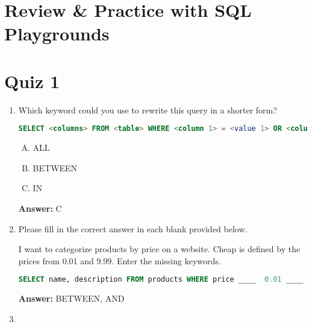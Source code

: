 \documentclass[12pt]{article}
\begin{document}
\bigskip

\section{Review \& Practice with SQL Playgrounds}

\bigskip

\section{Quiz 1}

\bigskip

\begin{enumerate}[1.]
    \item

    Which keyword could you use to rewrite this query in a shorter form?

    \bigskip

    \begin{lstlisting}[language=SQL]
    SELECT <columns> FROM <table> WHERE <column 1> = <value 1> OR <column 1> = <value 2> OR <column 1> = <value 3>;
    \end{lstlisting}

    \begin{enumerate}[A.]
        \item ALL
        \item BETWEEN
        \item IN
    \end{enumerate}

    \bigskip

    \textbf{Answer:} C

    \item

    Please fill in the correct answer in each blank provided below.

    \bigskip

    I want to categorize products by price on a website. Cheap is defined by the
    prices from 0.01 and 9.99. Enter the missing keywords.

    \bigskip

    \begin{lstlisting}[language=SQL]
    SELECT name, description FROM products WHERE price ____  0.01 ____ 9.99;
    \end{lstlisting}

    \bigskip

    \textbf{Answer:} BETWEEN, AND

    \item


\end{enumerate}
\end{document}
